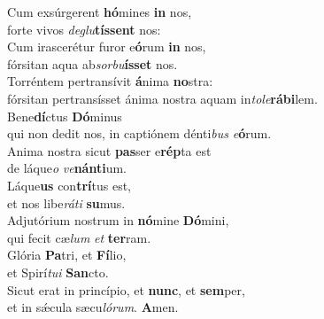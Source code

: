 \evenverse Cum exsúrgerent \textbf{hó}mines \textbf{in} nos,~\*\\
\evenverse forte vivos \textit{de}\textit{glu}\textbf{tís}\textbf{sent} nos:\\
\oddverse Cum irascerétur furor e\textbf{ó}rum \textbf{in} nos,~\*\\
\oddverse fórsitan aqua ab\textit{sor}\textit{bu}\textbf{ís}\textbf{set} nos.\\
\evenverse Torréntem pertransívit \textbf{á}nima \textbf{no}stra:~\*\\
\evenverse fórsitan pertransísset ánima nostra aquam in\textit{to}\textit{le}\textbf{rá}\textbf{bi}lem.\\
\oddverse Bene\textbf{dí}ctus \textbf{Dó}minus~\*\\
\oddverse qui non dedit nos, in captiónem dénti\textit{bus} \textit{e}\textbf{ó}rum.\\
\evenverse Anima nostra sicut \textbf{pas}ser e\textbf{rép}ta est~\*\\
\evenverse de láque\textit{o} \textit{ve}\textbf{nán}\textbf{ti}um.\\
\oddverse Láque\textbf{us} con\textbf{trí}tus est,~\*\\
\oddverse et nos libe\textit{rá}\textit{ti} \textbf{su}mus.\\
\evenverse Adjutórium nostrum in \textbf{nó}mine \textbf{Dó}mini,~\*\\
\evenverse qui fecit cæ\textit{lum} \textit{et} \textbf{ter}ram.\\
\oddverse Glória \textbf{Pa}tri, et \textbf{Fí}lio,~\*\\
\oddverse et Spirí\textit{tu}\textit{i} \textbf{San}cto.\\
\evenverse Sicut erat in princípio, et \textbf{nunc}, et \textbf{sem}per,~\*\\
\evenverse et in sǽcula sæcu\textit{ló}\textit{rum}. \textbf{A}men.\\
